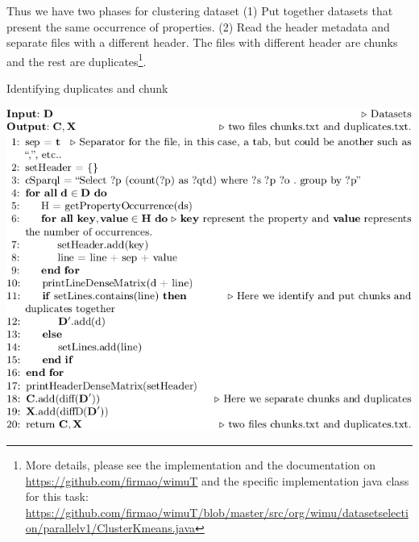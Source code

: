 Thus we have two phases for clustering dataset (1) Put together datasets that present the same occurrence of properties. (2) Read the header metadata and separate files with a different header. The files with different header are chunks and the rest are duplicates\footnote{More details, please see the implementation and the documentation on \url{https://github.com/firmao/wimuT} and the specific implementation java class for this task: \url{https://github.com/firmao/wimuT/blob/master/src/org/wimu/datasetselection/parallelv1/ClusterKmeans.java}}.


\begin{algorithm} [htb] 
	\caption{Identifying duplicates and chunk}
	\label{alg:dupchunk}
    \includegraphics[width=\linewidth]{sections/img/algDupChunk.png}
\end{algorithm}   

